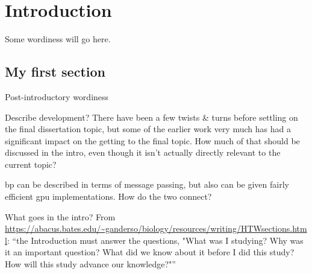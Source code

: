 \chapter{Introduction}
Some wordiness will go here.

\section{My first section}
Post-introductory wordiness

\begin{anfxerror}{Describe development?}
    There have been a few twists \& turns before settling on the final dissertation topic, but some of the earlier work very much has had a significant impact on the getting to the final topic.  How much of that should be discussed in the intro, even though it isn't actually directly relevant to the current topic?
\end{anfxerror}



\Gls{bp} can be described in terms of message passing, but also can be given fairly efficient \gls{gpu} implementations.  How do the two connect?

\begin{anfxwarning}{What goes in the intro?}
From \url{https://abacus.bates.edu/~ganderso/biology/resources/writing/HTWsections.html}:  ``the Introduction must answer the questions, "What was I studying? Why was it an important question? What did we know about it before I did this study? How will this study advance our knowledge?"''
\end{anfxwarning}

